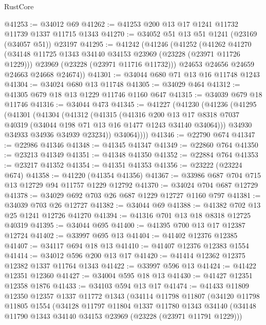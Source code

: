 \begin{lexlean}{RustCore}
\begin{coremodule}
@41253 := @34012 @69
@41262 := @41253 @200 @13 @17 @1241 @11732 @11739 @1337 @11715 @1343
@41270 := @34052 @51 @13 @51 @1241 (@23169 (@34057 @51)) @23197
@41295 := @41242
    (@41246
      (@41252
        (@41262
          @41270
          (@34148 @11725 @1343 @34140 @34153 @23969 (@23228 (@23971 @11726 @1229)))
          @23969
          (@23228 (@23971 @11716 @11732)))
        @24653
        @24656
        @24659
        @24663
        @24668
        @24674))
@41301 := @34044 @680 @71 @13 @16 @11748 @1243
@41304 := @34024 @680 @13 @11748
@41305 := @34029 @464
@41312 := @41305 @679 @18 @13 @1229 @11746 @1160 @647
@41315 := @34039 @679 @18 @11746
@41316 := @34044 @473
@41345 := @41227
    (@41230
      (@41236
        (@41295
          (@41301
            (@41304
              (@41312
                (@41315
                  (@41316
                    @200
                    @13
                    @17
                    @8318
                    @7037
                    @40319
                    (@34044 @198 @71 @13 @16 @1477 @1243 @34140 @34064)))
                @34930
                @34933
                @34936
                @34939
                @23234))
            @34064))))
@41346 := @22790 @674
@41347 := @22986 @41346
@41348 := @41345 @41347
@41349 := @22860 @764
@41350 := @23213 @41349
@41351 := @41348 @41350
@41352 := @22884 @764
@41353 := @23217 @41352
@41354 := @41351 @41353
@41356 := @23222 (@23224 @674)
@41358 := @41220 (@41354 @41356)
@41367 := @33986 @687 @704 @715 @13 @12729 @94 @11757 @1229 @12792
@41370 := @34024 @704 @687 @12729
@41378 := @34029 @692 @703 @26 @687 @1229 @12727 @1160 @797
@41381 := @34039 @703 @26 @12727
@41382 := @34044 @69
@41388 := @41382 @702 @13 @25 @1241 @12726 @41270
@41394 := @41316 @701 @13 @18 @8318 @12725 @40319
@41395 := @34044 @695
@41400 := @41395 @700 @13 @17 @12387 @12724
@41402 := @33997 @695 @13
@41404 := @41402 @12376 @12385
@41407 := @34117 @694 @18 @13
@41410 := @41407 @12376 @12383 @1554
@41414 := @34012 @596 @200 @13 @17
@41420 := @41414 @12362 @12375 @12382 @1337 @11764 @1343
@41422 := @33997 @596 @13
@41424 := @41422 @12351 @12360
@41427 := @34004 @595 @18 @13
@41430 := @41427 @12351 @12358 @1876
@41433 := @34103 @594 @13 @17
@41474 := @41433
    @11809
    @12350
    @12357
    @1337
    @11772
    @1343
    (@34114
      @11798
      @11807
      (@34120
        @11798
        @11805
        @1554
        (@34128
          @11797
          @11804
          @1337
          @11780
          @1343
          @34140
          (@34148 @11790 @1343 @34140 @34153 @23969 (@23228 (@23971 @11791 @1229)))

\end{coremodule}
\end{lexlean}

